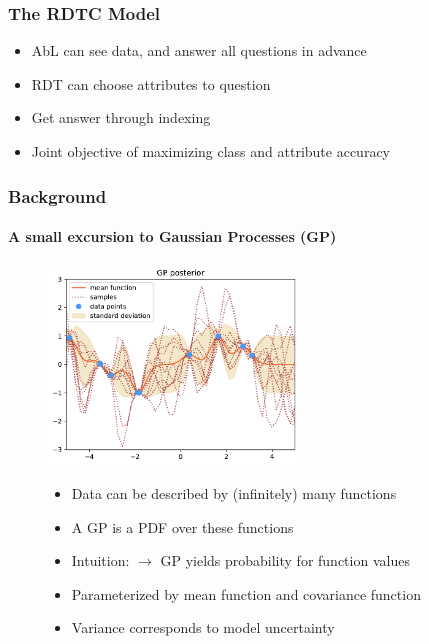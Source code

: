 \documentclass[9pt]{beamer}
\begin{document}
\begin{frame}
\frametitle{The RDTC Model \cite{alaniz2019explainable}}
\begin{itemize}
	\item AbL can see data, and answer all questions in advance
	\item RDT can choose attributes to question
	\item Get answer through indexing
	\item Joint objective of maximizing class and attribute accuracy
\end{itemize}
\end{frame}







\begin{frame}
\frametitle{Background}
\framesubtitle{A small excursion to Gaussian Processes (GP)}
\begin{figure}
	\centering
	\includegraphics[width=0.6\textwidth]{images/post.pdf}
	\begin{itemize}
		\item Data can be described by (infinitely) many functions
		\item A GP is a PDF over these functions
		\item Intuition: $\rightarrow$ GP yields probability for function values %
		\item Parameterized by mean function and covariance function
		\item Variance corresponds to model uncertainty
	\end{itemize}
\end{figure}
\end{frame}
\end{document}
